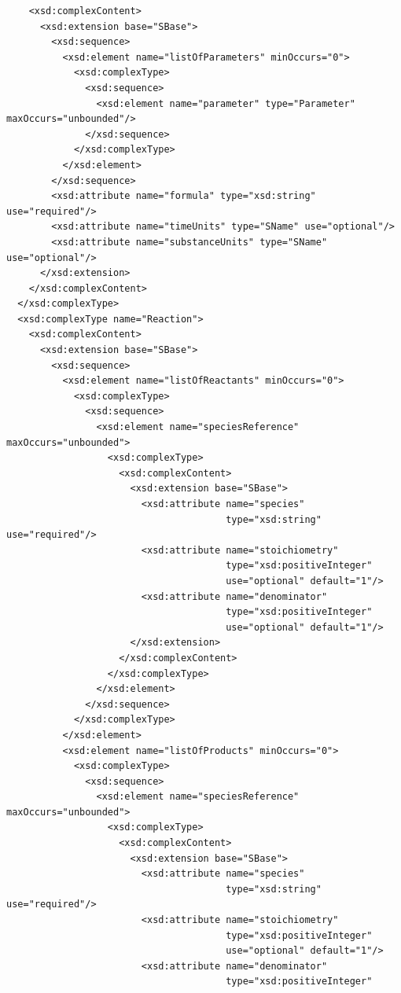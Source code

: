 \documentclass[10pt]{cekarticle}
\begin{document}
\begin{small}
\begin{verbatim}
    <xsd:complexContent>
      <xsd:extension base="SBase">
        <xsd:sequence>
          <xsd:element name="listOfParameters" minOccurs="0">
            <xsd:complexType>
              <xsd:sequence>
                <xsd:element name="parameter" type="Parameter" maxOccurs="unbounded"/>
              </xsd:sequence>
            </xsd:complexType>
          </xsd:element>
        </xsd:sequence>
        <xsd:attribute name="formula" type="xsd:string" use="required"/>
        <xsd:attribute name="timeUnits" type="SName" use="optional"/>
        <xsd:attribute name="substanceUnits" type="SName" use="optional"/>
      </xsd:extension>
    </xsd:complexContent>
  </xsd:complexType>
  <xsd:complexType name="Reaction">
    <xsd:complexContent>
      <xsd:extension base="SBase">
        <xsd:sequence>
          <xsd:element name="listOfReactants" minOccurs="0">
            <xsd:complexType>
              <xsd:sequence>
                <xsd:element name="speciesReference" maxOccurs="unbounded">
                  <xsd:complexType>
                    <xsd:complexContent>
                      <xsd:extension base="SBase">
                        <xsd:attribute name="species" 
                                       type="xsd:string" use="required"/>
                        <xsd:attribute name="stoichiometry" 
                                       type="xsd:positiveInteger" 
                                       use="optional" default="1"/>
                        <xsd:attribute name="denominator" 
                                       type="xsd:positiveInteger" 
                                       use="optional" default="1"/>
                      </xsd:extension>
                    </xsd:complexContent>
                  </xsd:complexType>
                </xsd:element>
              </xsd:sequence>
            </xsd:complexType>
          </xsd:element>
          <xsd:element name="listOfProducts" minOccurs="0">
            <xsd:complexType>
              <xsd:sequence>
                <xsd:element name="speciesReference" maxOccurs="unbounded">
                  <xsd:complexType>
                    <xsd:complexContent>
                      <xsd:extension base="SBase">
                        <xsd:attribute name="species" 
                                       type="xsd:string" use="required"/>
                        <xsd:attribute name="stoichiometry" 
                                       type="xsd:positiveInteger" 
                                       use="optional" default="1"/>
                        <xsd:attribute name="denominator" 
                                       type="xsd:positiveInteger" 

\end{verbatim}
\end{small}
\end{document}
